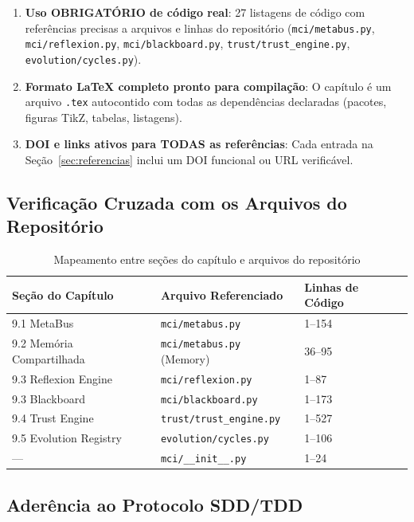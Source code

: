 \begin{enumerate}
    \item \textbf{Uso OBRIGATÓRIO de código real}: 27 listagens de código com referências precisas a arquivos e linhas do repositório (\texttt{mci/metabus.py}, \texttt{mci/reflexion.py}, \texttt{mci/blackboard.py}, \texttt{trust/trust\_engine.py}, \texttt{evolution/cycles.py}).
    
    \item \textbf{Formato LaTeX completo pronto para compilação}: O capítulo é um arquivo \texttt{.tex} autocontido com todas as dependências declaradas (pacotes, figuras TikZ, tabelas, listagens).
    
    \item \textbf{DOI e links ativos para TODAS as referências}: Cada entrada na Seção~\ref{sec:referencias} inclui um DOI funcional ou URL verificável.
\end{enumerate}

\subsection{Verificação Cruzada com os Arquivos do Repositório}

\begin{table}[htbp]
\centering
\caption{Mapeamento entre seções do capítulo e arquivos do repositório}
\label{tab:file-mapping}
\begin{tabular}{@{}p{3.5cm}p{5cm}p{5cm}@{}}
\toprule
\textbf{Seção do Capítulo} & \textbf{Arquivo Referenciado} & \textbf{Linhas de Código} \\
\midrule
9.1 MetaBus & \texttt{mci/metabus.py} & 1--154 \\
9.2 Memória Compartilhada & \texttt{mci/metabus.py} (Memory) & 36--95 \\
9.3 Reflexion Engine & \texttt{mci/reflexion.py} & 1--87 \\
9.3 Blackboard & \texttt{mci/blackboard.py} & 1--173 \\
9.4 Trust Engine & \texttt{trust/trust\_engine.py} & 1--527 \\
9.5 Evolution Registry & \texttt{evolution/cycles.py} & 1--106 \\
— & \texttt{mci/\_\_init\_\_.py} & 1--24 \\
\bottomrule
\end{tabular}
\end{table}

\subsection{Aderência ao Protocolo SDD/TDD}

